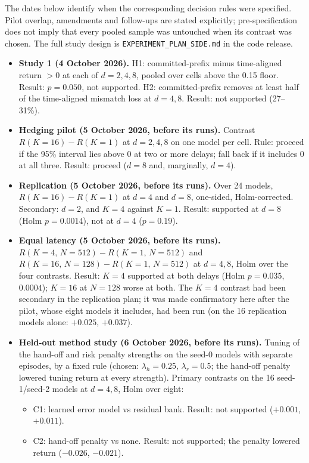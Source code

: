 The dates below identify when the corresponding decision rules were specified. Pilot overlap, amendments and follow-ups are stated explicitly; pre-specification does not imply that every pooled sample was untouched when its contrast was chosen. The full study design is \texttt{EXPERIMENT\_PLAN\_SIDE.md} in the code release.
\begin{itemize}
\item \textbf{Study 1 (4 October 2026).} H1: committed-prefix minus time-aligned return $>0$ at each of $d=2,4,8$, pooled over cells above the 0.15 floor. Result: $p=0.050$, not supported. H2: committed-prefix removes at least half of the time-aligned mismatch loss at $d=4,8$. Result: not supported (27--31\%).
\item \textbf{Hedging pilot (5 October 2026, before its runs).} Contrast $R(K=16)-R(K=1)$ at $d=2,4,8$ on one model per cell. Rule: proceed if the 95\% interval lies above 0 at two or more delays; fall back if it includes 0 at all three. Result: proceed ($d=8$ and, marginally, $d=4$).
\item \textbf{Replication (5 October 2026, before its runs).} Over 24 models, $R(K=16)-R(K=1)$ at $d=4$ and $d=8$, one-sided, Holm-corrected. Secondary: $d=2$, and $K=4$ against $K=1$. Result: supported at $d=8$ (Holm $p=0.0014$), not at $d=4$ ($p=0.19$).
\item \textbf{Equal latency (5 October 2026, before its runs).} $R(K=4,\,N=512)-R(K=1,\,N=512)$ and $R(K=16,\,N=128)-R(K=1,\,N=512)$ at $d=4,8$, Holm over the four contrasts. Result: $K=4$ supported at both delays (Holm $p=0.035$, $0.0004$); $K=16$ at $N=128$ worse at both. The $K=4$ contrast had been secondary in the replication plan; it was made confirmatory here after the pilot, whose eight models it includes, had been run (on the 16 replication models alone: $+0.025$, $+0.037$).
\item \textbf{Held-out method study (6 October 2026, before its runs).} Tuning of the hand-off and risk penalty strengths on the seed-0 models with separate episodes, by a fixed rule (chosen: $\lambda_h=0.25$, $\lambda_r=0.5$; the hand-off penalty lowered tuning return at every strength). Primary contrasts on the 16 seed-1/seed-2 models at $d=4,8$, Holm over eight:
\begin{itemize}
\item C1: learned error model vs residual bank. Result: not supported ($+0.001$, $+0.011$).
\item C2: hand-off penalty vs none. Result: not supported; the penalty lowered return ($-0.026$, $-0.021$).

\end{itemize}
\end{itemize}

